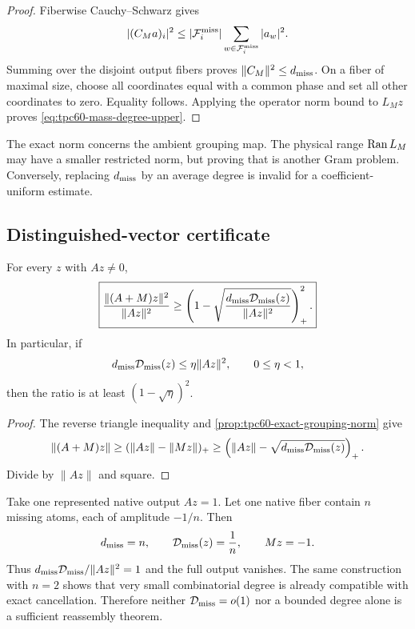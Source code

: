 \begin{proof}
Fiberwise Cauchy--Schwarz gives
\[
 |(C_Ma)_i|^2
 \le|\mathcal F_i^{\rm miss}|
    \sum_{w\in\mathcal F_i^{\rm miss}}|a_w|^2.
\]
Summing over the disjoint output fibers proves
\(\|C_M\|^2\le d_{\rm miss}\).  On a fiber of maximal size, choose all
coordinates equal with a common phase and set all other coordinates to
zero.  Equality follows.  Applying the operator norm bound to \(L_Mz\)
proves \eqref{eq:tpc60-mass-degree-upper}.
\end{proof}

The exact norm concerns the ambient grouping map.  The physical range
\(\operatorname{Ran} L_M\) may have a smaller restricted norm, but proving that is another
Gram problem.  Conversely, replacing \(d_{\rm miss}\) by an average degree
is invalid for a coefficient-uniform estimate.

\subsection{Distinguished-vector certificate}

\begin{theorem}
\label{thm:tpc60-pointwise-mass-degree}
For every \(z\) with \(Az\ne0\),
\begin{equation}
 \boxed{
 \frac{\|(A+M)z\|^2}{\|Az\|^2}
 \ge
 \left(
  1-
  \sqrt{\frac{d_{\rm miss}\mathcal D_{\rm miss}(z)}{\|Az\|^2}}
 \right)_+^2.}
 \label{eq:tpc60-pointwise-mass-degree-bound}
\end{equation}
In particular, if
\begin{equation}
 d_{\rm miss}\mathcal D_{\rm miss}(z)
 \le\eta\|Az\|^2,
 \qquad 0\le\eta<1,
 \label{eq:tpc60-eta-mass-degree}
\end{equation}
then the ratio is at least \((1-\sqrt\eta)^2\).
\end{theorem}

\begin{proof}
The reverse triangle inequality and
\cref{prop:tpc60-exact-grouping-norm} give
\[
 \|(A+M)z\|
 \ge(\|Az\|-\|Mz\|)_+
 \ge
 \left(
  \|Az\|-\sqrt{d_{\rm miss}\mathcal D_{\rm miss}(z)}
 \right)_+.
\]
Divide by \(\|Az\|\) and square.
\end{proof}

\begin{example}
\label{ex:tpc60-sharp-mass-degree-threshold}
Take one represented native output \(Az=1\).  Let one native fiber contain
\(n\) missing atoms, each of amplitude \(-1/n\).  Then
\begin{equation}
 d_{\rm miss}=n,
 \qquad
 \mathcal D_{\rm miss}(z)=\frac1n,
 \qquad
 Mz=-1.
 \label{eq:tpc60-threshold-example-data}
\end{equation}
Thus \(d_{\rm miss}\mathcal D_{\rm miss}/\|Az\|^2=1\) and the full output
vanishes.  The same construction with \(n=2\) shows that very small
combinatorial degree is already compatible with exact cancellation.
Therefore neither \(\mathcal D_{\rm miss}=o(1)\) nor a bounded degree alone is a
sufficient reassembly theorem.
\end{example}

